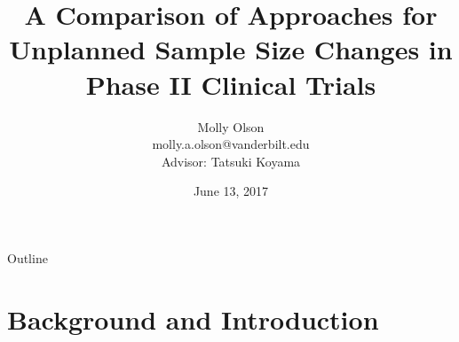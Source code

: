 \documentclass{beamer}\usepackage[]{graphicx}\usepackage[]{color}
\title[]{A Comparison of Approaches for Unplanned Sample Size Changes in Phase II Clinical Trials}
\author{Molly Olson \\ \small molly.a.olson@vanderbilt.edu \\ Advisor: Tatsuki Koyama}
\institute{Vanderbilt University \\ Department of Biostatistics}
\date{June 13, 2017}
\begin{document}
\frame{\titlepage}


\begin{frame}{Outline}
  \tableofcontents
\end{frame}

% 

\section{Background and Introduction}
\end{document}

